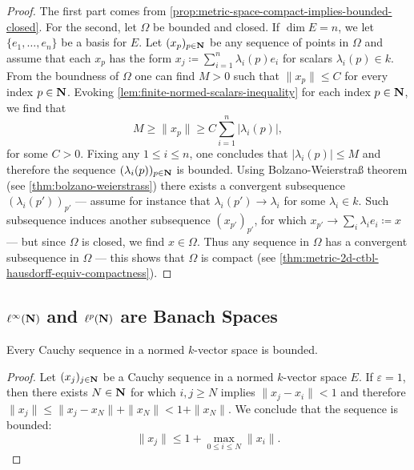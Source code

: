 \begin{proof}
    The first part comes from
    \cref{prop:metric-space-compact-implies-bounded-closed}. For the second, let
    \(\Omega\) be bounded and closed. If \(\dim E = n\), we let
    \(\{e_1, \dots, e_n\}\) be a basis for \(E\). Let \((x_p)_{p \in \mathbf{N}}\) be any
    sequence of points in \(\Omega\) and assume that each \(x_p\) has the form
    \(x_j\coloneq \sum_{i=1}^n \lambda_i(p) e_i\) for scalars
    \(\lambda_i(p) \in k\). From the boundness of \(\Omega\) one can find \(M > 0\)
    such that \(\| x_p \| \leq C\) for every index \(p \in \mathbf{N}\). Evoking
    \cref{lem:finite-normed-scalars-inequality} for each index \(p \in \mathbf{N}\), we find
    that
    \[
        M \geq \| x_p \| \geq C \sum_{i=1}^n |\lambda_i(p)|,
    \]
    for some \(C > 0\). Fixing any \(1 \leq i \leq n\), one concludes that
    \(|\lambda_i(p)| \leq M\) and therefore the sequence \((\lambda_i(p))_{p \in
            \mathbf{N}}\) is bounded. Using Bolzano-Weierstra{\ss} theorem (see
    \cref{thm:bolzano-weierstrass}) there exists a convergent subsequence
    \((\lambda_i(p'))_{p'}\) --- assume for instance that \(\lambda_i(p') \to
    \lambda_i\) for some \(\lambda_i \in k\). Such subsequence induces another
    subsequence \((x_{p'})_{p'}\), for which \(x_{p'} \to \sum_i \lambda_i e_i
    \coloneq x\) --- but since \(\Omega\) is closed, we find \(x \in \Omega\). Thus
    any sequence in \(\Omega\) has a convergent subsequence in \(\Omega\) --- this
    shows that \(\Omega\) is compact (see
    \cref{thm:metric-2d-ctbl-hausdorff-equiv-compactness}).
\end{proof}

\subsection{%
    \texorpdfstring{\(\ell^{\infty}(\mathbf{N})\)}{l infinity} and
    \texorpdfstring{\(\ell^p(\mathbf{N})\)}{lp} are Banach Spaces
}

\begin{lemma}
    \label{lem:cauchy-bounded}
    Every Cauchy sequence in a normed \(k\)-vector space is bounded.
\end{lemma}

\begin{proof}
    Let \((x_j)_{j \in \mathbf{N}}\) be a Cauchy sequence in a normed \(k\)-vector space
    \(E\). If \(\varepsilon = 1\), then there exists \(N \in \mathbf{N}\) for which \(i, j
    \geq N\) implies \(\| x_j - x_i \| < 1\) and therefore \(\| x_j \| \leq \| x_j -
    x_N \| + \| x_N \| < 1 + \| x_N \|\). We conclude that the sequence is bounded:
    \[
        \| x_j \| \leq 1 + \max_{0 \leq i \leq N} \| x_i \|.
    \]
\end{proof}

